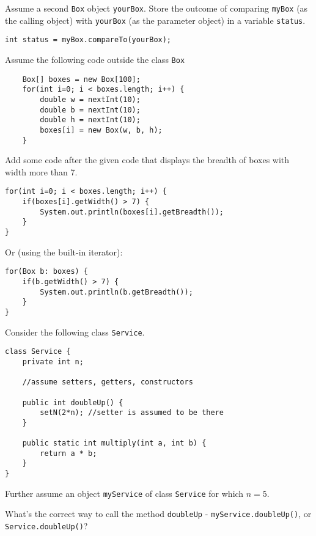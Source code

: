 \documentclass[11pt]{exam}
\begin{document}
\begin{questions}
Assume a second \texttt{Box} object \texttt{yourBox}. Store the outcome of comparing \texttt{myBox} (as the calling object) with \texttt{yourBox} (as the parameter object) in a variable \texttt{status}.

\begin{solution}
\begin{lstlisting}
int status = myBox.compareTo(yourBox);
\end{lstlisting}
\end{solution}

Assume the following code outside the class \texttt{Box}

\begin{lstlisting}
	Box[] boxes = new Box[100];
	for(int i=0; i < boxes.length; i++) {
		double w = nextInt(10);
		double b = nextInt(10);
		double h = nextInt(10);
		boxes[i] = new Box(w, b, h);
	}
\end{lstlisting}

Add some code after the given code that displays the breadth of boxes with width more than 7.

\begin{solution}
\begin{lstlisting}
for(int i=0; i < boxes.length; i++) {
	if(boxes[i].getWidth() > 7) {
		System.out.println(boxes[i].getBreadth());
	}
}
\end{lstlisting}

Or (using the built-in iterator):

\begin{lstlisting}
for(Box b: boxes) {
	if(b.getWidth() > 7) {
		System.out.println(b.getBreadth());
	}
}
\end{lstlisting}
\end{solution}

\newpage
\question Consider the following class \texttt{Service}.

\begin{lstlisting}
class Service {
	private int n;
	
	//assume setters, getters, constructors
	
	public int doubleUp() {
		setN(2*n); //setter is assumed to be there
	}
	
	public static int multiply(int a, int b) {
		return a * b;
	}
}	
\end{lstlisting}

Further assume an object \texttt{myService} of class \texttt{Service} for which $n = 5$.

What's the correct way to call the method \texttt{doubleUp} - \texttt{myService.doubleUp()}, or \texttt{Service.doubleUp()}? 


\end{questions}
\end{document}
